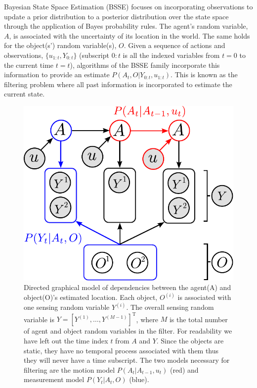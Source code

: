 Bayesian State Space Estimation (BSSE) focuses on incorporating observations to update a prior distribution to a posterior distribution 
over the state space through the application of Bayes probability rules. The agent's random variable, $A$, 
is associated with the uncertainty of its location in the world. The same holds for the object(s') random variable(s), $O$. 
Given a sequence of actions and observations, $\{u_{1:t},Y_{0:t}\}$ (subscript $0:t$ is all the indexed variables from $t=0$ to the current time $t=t$), 
algorithms of the BSSE family incorporate this information to provide an estimate $P(A_t,O|Y_{0:t},u_{1:t})$. This is known as the 
filtering problem where all past information is incorporated to estimate the current state.  

\begin{figure}
\centering
\includegraphics[width=\textwidth]{./ch5-MLMF/Figures/explenation/Figure2.pdf}
\caption{Directed graphical model of dependencies between the agent(A) and object(O)'s estimated location. Each 
object, $O^{(i)}$ is associated with one sensing random variable $Y^{(i)}$. The overall sensing random variable is $Y = \left[Y^{(1)},\dots,Y^{(M-1)}\right]^{\mathrm{T}}$,
where $M$ is the total number of agent and object random variables in the filter. 
For readability we have left out the time index $t$ from $A$ and $Y$. Since the objects are static, they have no temporal process associated with 
them thus they will never have a time subscript. The two models necessary for filtering are the motion model $P(A_t|A_{t-1},u_t)$ (red) and measurement model
$P(Y_t|A_t,O)$ (blue).}
\label{fig:bayesian_sse_dag}
\end{figure}

